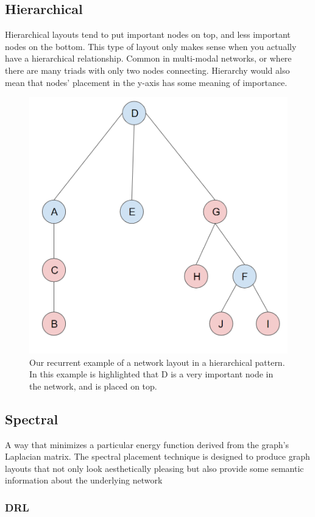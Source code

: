 \subsection{Hierarchical}

Hierarchical layouts tend to put important nodes on top, and less important nodes on the bottom. This type of layout only makes sense when you actually have a hierarchical relationship. Common in multi-modal networks, or where there are many triads with only two nodes connecting. Hierarchy would also mean that nodes' placement in the y-axis has some meaning of importance.

    \begin{figure}[h!]
        \centering
            \includegraphics[width=0.5\linewidth]{figures/Networks/Layouts/hirearchy.png} 
        \caption{Our recurrent example of a network layout in a hierarchical pattern. In this example is highlighted that D is a very important node in the network, and is placed on top.}
        \label{figure:networkExampleHierarchy}
    \end{figure}

\newpage

\subsection{Spectral}

A way that minimizes a particular energy function derived from the graph's Laplacian matrix. The spectral placement technique is designed to produce graph layouts that not only look aesthetically pleasing but also provide some semantic information about the underlying network

\subsubsection{DRL}

